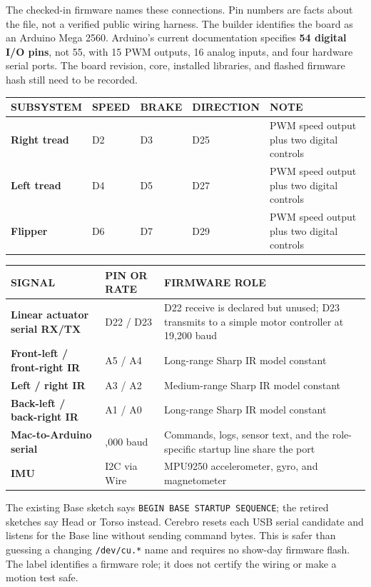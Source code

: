 \documentclass[11pt,openany]{book}
\begin{document}
The checked-in firmware names these connections. Pin numbers are facts about the file, not a verified public wiring harness. The builder identifies the board as an Arduino Mega 2560. Arduino's current documentation specifies \textbf{54 digital I/O pins}, not 55, with 15 PWM outputs, 16 analog inputs, and four hardware serial ports. The board revision, core, installed libraries, and flashed firmware hash still need to be recorded.

\ROBArduinoWiringDiagram

\begin{tabularx}{\textwidth}{>{\robcondensed\bfseries}p{1.40in} >{\centering\arraybackslash}p{0.68in} >{\centering\arraybackslash}p{0.68in} >{\centering\arraybackslash}p{0.83in} X}
\toprule
SUBSYSTEM & SPEED & BRAKE & DIRECTION & NOTE\\
\midrule
Right tread & D2 & D3 & D25 & PWM speed output plus two digital controls\\
Left tread & D4 & D5 & D27 & PWM speed output plus two digital controls\\
Flipper & D6 & D7 & D29 & PWM speed output plus two digital controls\\
\bottomrule
\end{tabularx}

\begin{tabularx}{\textwidth}{>{\robcondensed\bfseries}p{1.5in} >{\centering\arraybackslash}p{1.05in} X}
\toprule
SIGNAL & PIN OR RATE & FIRMWARE ROLE\\
\midrule
Linear actuator serial RX/TX & D22 / D23 & D22 receive is declared but unused; D23 transmits to a simple motor controller at 19,200 baud\\
Front-left / front-right IR & A5 / A4 & Long-range Sharp IR model constant\\
Left / right IR & A3 / A2 & Medium-range Sharp IR model constant\\
Back-left / back-right IR & A1 / A0 & Long-range Sharp IR model constant\\
Mac-to-Arduino serial & 250,000 baud & Commands, logs, sensor text, and the role-specific startup line share the port\\
IMU & I2C via Wire & MPU9250 accelerometer, gyro, and magnetometer\\
\bottomrule
\end{tabularx}

The existing Base sketch says \texttt{BEGIN BASE STARTUP SEQUENCE}; the retired sketches say Head or Torso instead. Cerebro resets each USB serial candidate and listens for the Base line without sending command bytes. This is safer than guessing a changing \texttt{/dev/cu.*} name and requires no show-day firmware flash. The label identifies a firmware role; it does not certify the wiring or make a motion test safe.
\end{document}
